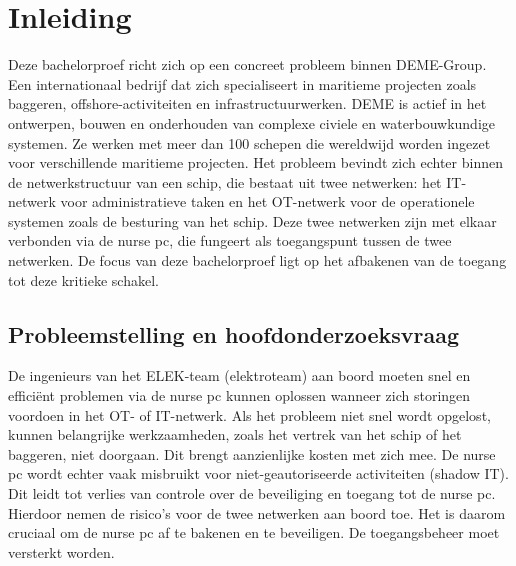 


% 

\section{Inleiding}%
\label{sec:inleiding}
Deze bachelorproef richt zich op een concreet probleem binnen DEME-Group. Een internationaal bedrijf dat zich specialiseert in maritieme projecten zoals baggeren, offshore-activiteiten en infrastructuurwerken. 
DEME is actief in het ontwerpen, bouwen en onderhouden van complexe civiele en waterbouwkundige systemen. Ze werken met meer dan 100 schepen die wereldwijd worden ingezet voor verschillende maritieme projecten.
Het probleem bevindt zich echter binnen de netwerkstructuur van een schip, die bestaat uit twee netwerken: 
het IT-netwerk voor administratieve taken en het OT-netwerk voor de operationele systemen zoals de besturing van het schip. Deze twee netwerken zijn met elkaar verbonden via de nurse pc, die fungeert 
als toegangspunt tussen de twee netwerken. De focus van deze bachelorproef ligt op het afbakenen van de toegang tot deze kritieke schakel.

\subsection{Probleemstelling en hoofdonderzoeksvraag}
De ingenieurs van het ELEK-team (elektroteam) aan boord moeten snel en efficiënt problemen via de nurse pc kunnen oplossen wanneer zich storingen voordoen in het OT- of IT-netwerk. Als het probleem niet snel wordt opgelost, kunnen belangrijke werkzaamheden, 
zoals het vertrek van het schip of het baggeren, niet doorgaan. Dit brengt aanzienlijke kosten met zich mee.
De nurse pc wordt echter vaak misbruikt voor niet-geautoriseerde activiteiten (shadow IT). Dit leidt tot verlies van controle over de beveiliging en toegang tot de nurse pc. 
Hierdoor nemen de risico’s voor de twee netwerken aan boord toe. 
Het is daarom cruciaal om de nurse pc af te bakenen en te beveiligen. De toegangsbeheer moet versterkt worden.

